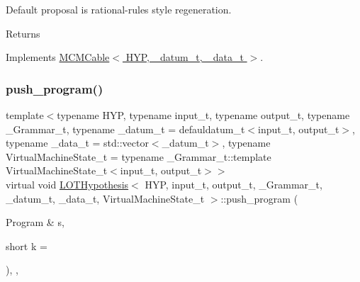 Default proposal is rational-\/rules style regeneration. \begin{DoxyReturn}{Returns}

\end{DoxyReturn}


Implements \hyperlink{class_m_c_m_cable_ab119a14256ab92c5c1e941f8492df830}{M\+C\+M\+Cable$<$ H\+Y\+P, \+\_\+datum\+\_\+t, \+\_\+data\+\_\+t $>$}.

\mbox{\label{class_l_o_t_hypothesis_a2b9a0eca1e2124f92bd34d8da929fe71}} 
\subsubsection{\texorpdfstring{push\+\_\+program()}{push\_program()}}
{\footnotesize\ttfamily template$<$typename H\+YP, typename input\+\_\+t, typename output\+\_\+t, typename \+\_\+\+Grammar\+\_\+t, typename \+\_\+datum\+\_\+t = defauldatum\+\_\+t$<$input\+\_\+t, output\+\_\+t$>$, typename \+\_\+data\+\_\+t = std\+::vector$<$\+\_\+datum\+\_\+t$>$, typename Virtual\+Machine\+State\+\_\+t = typename \+\_\+\+Grammar\+\_\+t\+::template Virtual\+Machine\+State\+\_\+t$<$input\+\_\+t, output\+\_\+t$>$$>$ \\
virtual void \hyperlink{class_l_o_t_hypothesis}{L\+O\+T\+Hypothesis}$<$ H\+YP, input\+\_\+t, output\+\_\+t, \+\_\+\+Grammar\+\_\+t, \+\_\+datum\+\_\+t, \+\_\+data\+\_\+t, Virtual\+Machine\+State\+\_\+t $>$\+::push\+\_\+program (\begin{DoxyParamCaption}\item[{Program \&}]{s,  }\item[{short}]{k = {} }\end{DoxyParamCaption})\hspace{0.3cm}{\ttfamily [inline]}, {\ttfamily [override]}, {\ttfamily [virtual]}}

\mbox{\label{class_l_o_t_hypothesis_a0791b7ba0105870a2094877445570b61}} 
